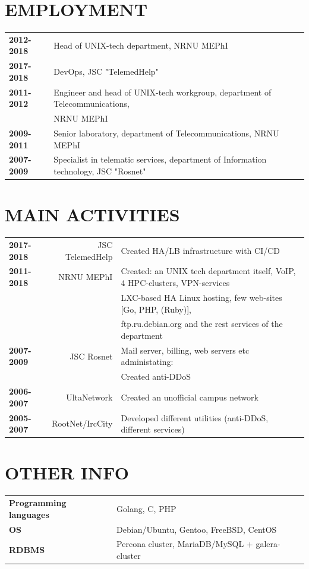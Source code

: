 \begin{resume}
\section{EMPLOYMENT}
\vspace{0.1in} 
\begin{tabular}{ll}
    {\bf 2012-2018} & Head of UNIX-tech department, NRNU MEPhI\\
    {\bf 2017-2018} & DevOps, JSC "TelemedHelp"\\
    {\bf 2011-2012} & Engineer and head of UNIX-tech workgroup, department of Telecommunications,\\
                    & NRNU MEPhI\\
    {\bf 2009-2011} & Senior laboratory, department of Telecommunications, NRNU MEPhI\\
    {\bf 2007-2009} & Specialist in telematic services, department of Information technology, JSC "Rosnet"\\
\end{tabular}

\section{MAIN ACTIVITIES}
\vspace{0.1in} 
\begin{tabular}{lrl}
    {\bf 2017-2018} & JSC TelemedHelp & Created HA/LB infrastructure with CI/CD\\
    {\bf 2011-2018 }& NRNU MEPhI      & Created: an UNIX tech department itself, VoIP, 4 HPC-clusters, VPN-services\\
                    &                 & LXC-based HA Linux hosting, few web-sites [Go, PHP, (Ruby)],\\
                    &                 & ftp.ru.debian.org and the rest services of the department\\
    {\bf 2007-2009} & JSC Rosnet      & Mail server, billing, web servers etc administating:\\
                    &                 & Created anti-DDoS\\
    {\bf 2006-2007} & UltaNetwork     & Created an unofficial campus network\\
    {\bf 2005-2007} & RootNet/IrcCity & Developed different utilities (anti-DDoS, different services)\\
\end{tabular}

\section{OTHER INFO}
\vspace{0.1in} 
\begin{tabular}{ll}
{\bf Programming languages} & Golang, C, PHP\\
{\bf OS}                    & Debian/Ubuntu, Gentoo, FreeBSD, CentOS\\
{\bf RDBMS}                 & Percona cluster, MariaDB/MySQL + galera-cluster\\
\end{tabular}


\end{resume}
